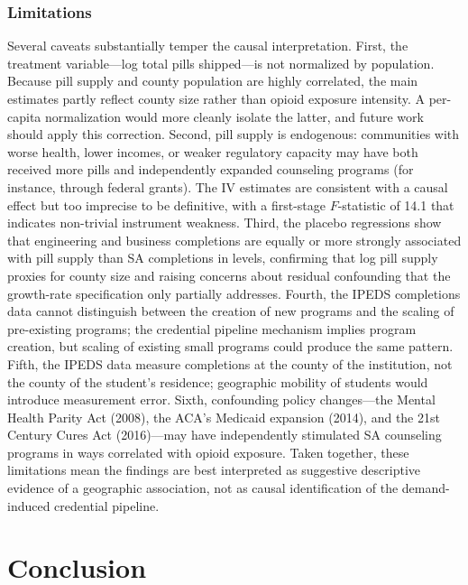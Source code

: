 \documentclass[12pt]{article}
\begin{document}
\subsubsection*{Limitations} Several caveats substantially temper the causal interpretation. First, the treatment variable---log total pills shipped---is not normalized by population. Because pill supply and county population are highly correlated, the main estimates partly reflect county size rather than opioid exposure intensity. A per-capita normalization would more cleanly isolate the latter, and future work should apply this correction. Second, pill supply is endogenous: communities with worse health, lower incomes, or weaker regulatory capacity may have both received more pills and independently expanded counseling programs (for instance, through federal grants). The IV estimates are consistent with a causal effect but too imprecise to be definitive, with a first-stage $F$-statistic of 14.1 that indicates non-trivial instrument weakness. Third, the placebo regressions show that engineering and business completions are equally or more strongly associated with pill supply than SA completions in levels, confirming that log pill supply proxies for county size and raising concerns about residual confounding that the growth-rate specification only partially addresses. Fourth, the IPEDS completions data cannot distinguish between the creation of new programs and the scaling of pre-existing programs; the credential pipeline mechanism implies program creation, but scaling of existing small programs could produce the same pattern. Fifth, the IPEDS data measure completions at the county of the institution, not the county of the student's residence; geographic mobility of students would introduce measurement error. Sixth, confounding policy changes---the Mental Health Parity Act (2008), the ACA's Medicaid expansion (2014), and the 21st Century Cures Act (2016)---may have independently stimulated SA counseling programs in ways correlated with opioid exposure. Taken together, these limitations mean the findings are best interpreted as suggestive descriptive evidence of a geographic association, not as causal identification of the demand-induced credential pipeline.


\section{Conclusion}
\end{document}
